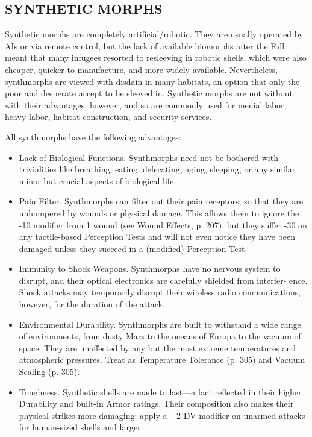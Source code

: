 \subsection{SYNTHETIC MORPHS}

Synthetic morphs are completely artificial/robotic.  They are usually operated
by AIs or via remote control, but the lack of available biomorphs after the
Fall meant that many infugees resorted to resleeving in robotic shells, which
were also cheaper, quicker to manufacture, and more widely
available. Nevertheless, synthmorphs are viewed with disdain in many habitats,
an option that only the poor and desperate accept to be sleeved in. Synthetic
morphs are not without with their advantages, however, and so are commonly used
for menial labor, heavy labor, habitat construction, and security services.

All synthmorphs have the following advantages:

\begin{itemize}
\item Lack of Biological Functions. Synthmorphs need not be bothered with
  trivialities like breathing, eating, defecating, aging, sleeping, or any
  similar minor but crucial aspects of biological life.
\item Pain Filter. Synthmorphs can filter out their pain receptors, so that
  they are unhampered by wounds or physical damage. This allows them to ignore
  the -10 modifier from 1 wound (see Wound Effects, p. 207), but they suffer
  -30 on any tactile-based Perception Tests and will not even notice they have
  been damaged unless they succeed in a (modified) Perception Test.
\item Immunity to Shock Weapons. Synthmorphs have no nervous system to disrupt,
  and their optical electronics are carefully shielded from interfer-
  ence. Shock attacks may temporarily disrupt their wireless radio
  communications, however, for the duration of the attack.
\item Environmental Durability. Synthmorphs are built to withstand a wide range
  of environments, from dusty Mars to the oceans of Europa to the vacuum of
  space. They are unaffected by any but the most extreme temperatures and
  atmospheric pressures. Treat as Temperature Tolerance (p.  305) and Vacuum
  Sealing (p. 305).
\item Toughness. Synthetic shells are made to last—a fact reflected in their
  higher Durability and built-in Armor ratings. Their composition also makes
  their physical strikes more damaging: apply a +2 DV modifier on unarmed
  attacks for human-sized shells and larger.
\end{itemize}

